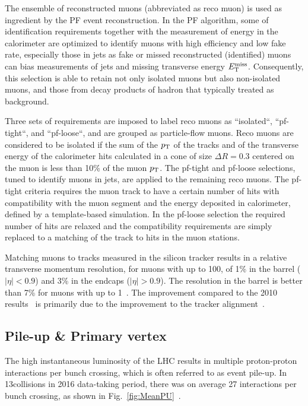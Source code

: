 		The ensemble of reconstructed muons (abbreviated as reco muon) is used as ingredient by the PF event reconstruction. In the PF algorithm, some of identification requirements together with the measurement of energy in the calorimeter are optimized to identify muons with high efficiency and low fake rate, especially those in jets as fake or missed reconstructed (identified) muons can bias measurements of jets and missing transverse energy $E_{\mathrm{T}}^{\text{miss}}$. 
		Consequently, this selection is able to retain not only isolated muons but also non-isolated muons, and those from decay products of hadron that typically treated as background.
		
		Three sets of requirements are imposed to label reco muons as ``isolated``, ``pf-tight``, and ``pf-loose``, and are grouped as particle-flow muons. Reco muons are considered to be isolated if the sum of the $p_{\mathrm{T}}$ of the tracks and of the transverse energy of the calorimeter hits calculated in a cone of size $\Delta R=0.3$ centered on the muon is less than 10\% of the muon $p_{\mathrm{T}}$. The pf-tight and pf-loose selections, tuned to identify muons in jets, are applied to the remaining reco muons. The pf-tight criteria requires the muon track to have a certain number of hits with compatibility with the muon segment and the energy deposited in calorimeter, defined by a template-based simulation. In the pf-loose selection the required number of hits are relaxed and the compatibility requirements are simply replaced to a matching of the track to hits in the muon stations. 
		
		Matching muons to tracks measured in the silicon tracker results in a relative transverse momentum resolution, for muons with \pt up to 100\GeV, of 1\% in the barrel ($\lvert\eta\rvert < 0.9$) and 3\% in the endcaps ($\lvert\eta\rvert > 0.9$). The \pt resolution in the barrel is better than 7\% for muons with \pt up to 1\TeV~\cite{Sirunyan:2018fpa}. The improvement compared to the 2010 results~\cite{Chatrchyan:2012xi} is primarily due to the improvement to the tracker alignment~\cite{Chatrchyan:2014wfa}. 
		
		\subsection{Pile-up \& Primary vertex}
		The high instantaneous luminosity of the LHC results in multiple proton-proton interactions per bunch crossing, which is often referred to as event pile-up. In 13\TeV collisions in 2016 data-taking period, there was on average 27 interactions per bunch crossing, as shown in Fig.~\ref{fig:MeanPU}~\cite{CMSLUMI}.
		
